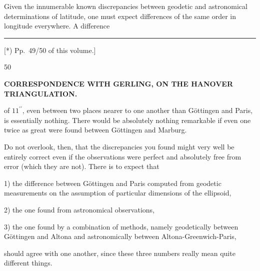 \par\noindent\hspace*{\parindent}Given the innumerable known discrepancies between geodetic and astronomical determinations of latitude, one must expect differences of the same order in longitude everywhere. A difference
\par\vfill
\noindent\rule{.22\linewidth}{.4pt}\par\smallskip
{\footnotesize\noindent\hspace*{\parindent}[*) Pp.~49/50 of this volume.]\par}
\medskip{}\hfill 50\hspace*{1.5em}\par

\clearpage
\noindent{}\hfill{\footnotesize\textbf{CORRESPONDENCE WITH GERLING, ON THE HANOVER TRIANGULATION.}}\hfill\null\par\medskip
\noindent of \(11^{\prime\prime}\), even between two places  nearer to one another than Göttingen and Paris, is essentially nothing. There would be absolutely nothing remarkable if even one twice as great were found between Göttingen and Marburg.
\par\noindent\hspace*{\parindent}Do not overlook, then, that the discrepancies you found might very well be entirely correct even if  the observations were perfect and absolutely free from error (which they are not). There is  to expect that
\par\noindent\hspace*{\parindent}1) the difference between Göttingen and Paris computed from geodetic measurements on the assumption of particular dimensions of the ellipsoid,
\par\noindent\hspace*{\parindent}2) the one found from astronomical observations,
\par\noindent\hspace*{\parindent}3) the one found by a combination of methods, namely geodetically between Göttingen and Altona and astronomically between Altona-Greenwich-Paris,
\par\noindent should agree with one another, since these three numbers really mean quite different things.
